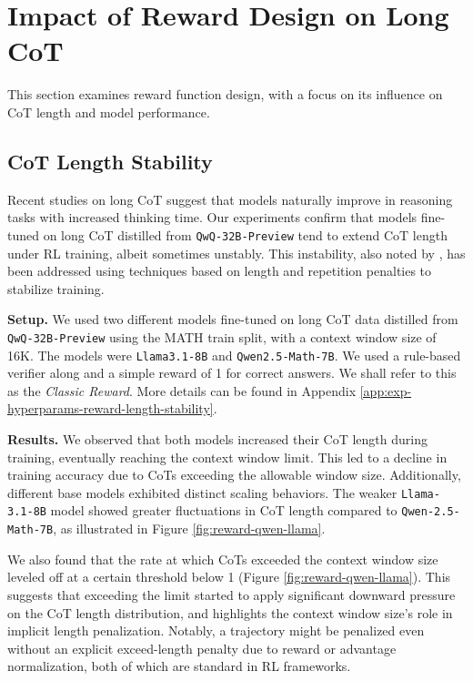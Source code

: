 

\section{Impact of Reward Design on Long CoT}\label{sec:reward-design}

This section examines reward function design, with a focus on its influence on CoT length and model performance.

\subsection{CoT Length Stability}
\label{result:reward-length-stability}

Recent studies on long CoT \cite{deepseekai2025r1, kimi2025k15, hou2025advancinglanguagemodelreasoning} suggest that models naturally improve in reasoning tasks with increased thinking time. Our experiments confirm that models fine-tuned on long CoT distilled from \texttt{QwQ-32B-Preview} tend to extend CoT length under RL training, albeit sometimes unstably. This instability, also noted by \citet{kimi2025k15, hou2025advancinglanguagemodelreasoning}, has been addressed using techniques based on length and repetition penalties to stabilize training.

 \noindent\textbf{Setup.} We used two different models fine-tuned on long CoT data distilled from \texttt{QwQ-32B-Preview} using the MATH train split, with a context window size of 16K. The models were \texttt{Llama3.1-8B} and \texttt{Qwen2.5-Math-7B}. We used a rule-based verifier along and a simple reward of 1 for correct answers. We shall refer to this as the \textit{Classic Reward}. More details can be found in Appendix \ref{app:exp-hyperparams-reward-length-stability}.

\noindent\textbf{Results.} We observed that both models increased their CoT length during training, eventually reaching the context window limit. This led to a decline in training accuracy due to CoTs exceeding the allowable window size. Additionally, different base models exhibited distinct scaling behaviors. The weaker \texttt{Llama-3.1-8B} model showed greater fluctuations in CoT length compared to \texttt{Qwen-2.5-Math-7B}, as illustrated in Figure \ref{fig:reward-qwen-llama}.

We also found that the rate at which CoTs exceeded the context window size leveled off at a certain threshold below 1 (Figure \ref{fig:reward-qwen-llama}). This suggests that exceeding the limit started to apply significant downward pressure on the CoT length distribution, and highlights the context window size's role in implicit length penalization. Notably, a trajectory might be penalized even without an explicit exceed-length penalty due to reward or advantage normalization, both of which are standard in RL frameworks.

